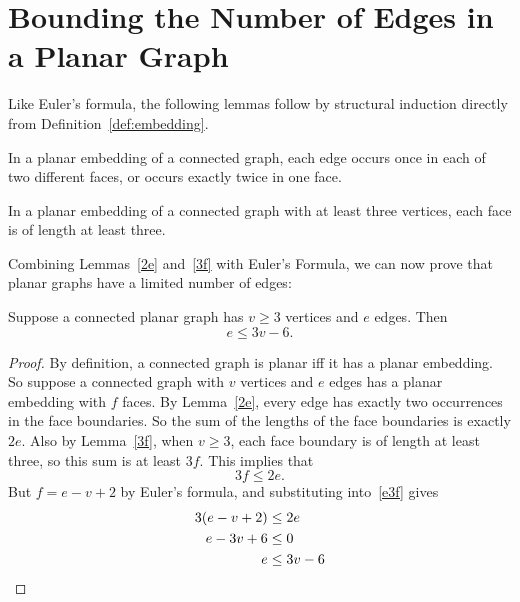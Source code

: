 \section{Bounding the Number of Edges in a Planar Graph}

Like Euler's formula, the following lemmas follow by structural induction
directly from Definition~\ref{def:embedding}.

\begin{lemma}\label{2e}
In a planar embedding of a connected graph, each edge occurs once in
each of two different faces, or occurs exactly twice in one face.
\end{lemma}

\begin{lemma}\label{3f}
  In a planar embedding of a connected graph with at least three vertices,
  each face is of length at least three.
\end{lemma}

Combining Lemmas~\ref{2e} and~\ref{3f} with Euler's Formula, we can
now prove that planar graphs have a limited number of edges:

\begin{theorem}\label{th:e3v}
  Suppose a connected planar graph has $v \geq 3$ vertices and $e$
  edges.  Then
\begin{equation}\label{eq:e3v}
    e \leq 3v-6.
\end{equation}
\end{theorem}

\begin{proof}
By definition, a connected graph is planar iff it has a planar
embedding.  So suppose a connected graph with $v$ vertices and $e$
edges has a planar embedding with $f$ faces.  By Lemma~\ref{2e}, every
edge has exactly two occurrences in the face boundaries.  So the sum
of the lengths of the face boundaries is exactly $2e$.  Also by
Lemma~\ref{3f}, when $v \geq 3$, each face boundary is of length at
least three, so this sum is at least $3f$.  This implies that
\begin{equation}\label{e3f}
3f \leq 2e.
\end{equation}
But $f = e-v+2$ by Euler's formula, and substituting into~\eqref{e3f} gives
\begin{align*}
3(e-v+2) & \leq 2e\\
e-3v + 6  & \leq 0\\
e & \leq 3v - 6 \qedhere
\end{align*}
\end{proof}

